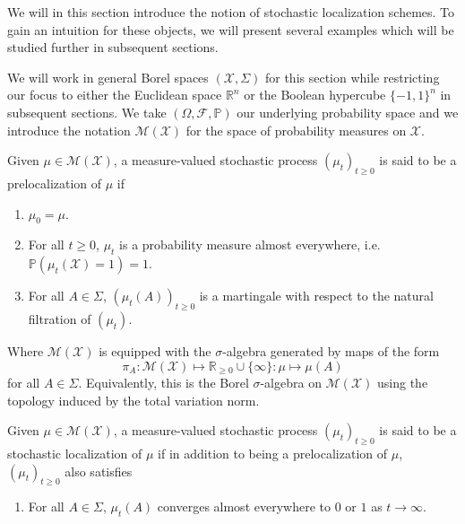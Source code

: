 We will in this section introduce the notion of stochastic localization schemes. 
To gain an intuition for these objects, we will present several examples which 
will be studied further in subsequent sections. 

We will work in general Borel spaces \((\mathcal{X}, \Sigma)\) for this section while restricting our 
focus to either the Euclidean space \(\mathbb{R}^n\) or the Boolean hypercube \(\{-1, 1\}^n\) 
in subsequent sections. We take \((\Omega, \mathscr{F}, \mathbb{P})\) our underlying probability space 
and we introduce the notation \(\mathcal{M}(\mathcal{X})\) for the space of probability measures on 
\(\mathcal{X}\).

\begin{definition}
  Given \(\mu \in \mathcal{M}(\mathcal{X})\), a measure-valued stochastic process 
  \((\mu_t)_{t \ge 0}\) is said to be a prelocalization of \(\mu\) if 
  \begin{enumerate}[label=(L\arabic*), start=0]
    \item \label{L0} \(\mu_0 = \mu\).
    \item \label{L1} For all \(t \ge 0\), \(\mu_t\) is a probability measure almost everywhere, i.e. 
      \(\mathbb{P}(\mu_t(\mathcal{X}) = 1) = 1\).
    \item \label{L2} For all \(A \in \Sigma\), \((\mu_t(A))_{t \ge 0}\) is a martingale with respect 
      to the natural filtration of \((\mu_t)\).
  \end{enumerate}
  Where \(\mathcal{M}(\mathcal{X})\) is equipped with the \(\sigma\)-algebra generated by maps of the form 
  \[\pi_A : \mathcal{M}(\mathcal{X}) \mapsto \mathbb{R}_{\ge 0} \cup \{\infty\} : \mu \mapsto \mu(A)\] 
  for all \(A \in \Sigma\). Equivalently, this is the Borel \(\sigma\)-algebra on \(\mathcal{M}(\mathcal{X})\) 
  using the topology induced by the total variation norm.
\end{definition}

\begin{definition}
  Given \(\mu \in \mathcal{M}(\mathcal{X})\), a measure-valued stochastic process 
  \((\mu_t)_{t \ge 0}\) is said to be a stochastic localization of \(\mu\) if in addition to being a 
  prelocalization of \(\mu\), \((\mu_t)_{t \ge 0}\) also satisfies
  \begin{enumerate}[label=(L\arabic*), start=3]
    \item \label{L3} For all \(A \in \Sigma\), \(\mu_t(A)\) converges almost everywhere to \(0\) 
      or \(1\) as \(t \to \infty\).
  \end{enumerate}
\end{definition}

